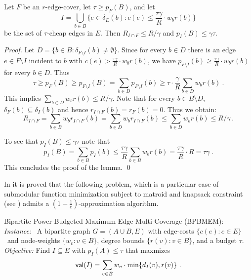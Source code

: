 \documentclass{llncs}
\begin{document}
\begin{lemma} \label{l:cheap}
Let $F$ be an $r$-edge-cover, let $\tau \geq p_F(B)$, and let 
$$I=\bigcup\limits_{b \in B} \{e \in \delta_E(b):c(e) \leq \frac{\tau\gamma}{R} \cdot w_b r(b)\}$$ 
be the set of $\tau$-cheap edges in $E$.
Then $R_{I \cap F} \leq R/\gamma$ and $p_I(B) \leq \gamma \tau$.
\end{lemma}
\begin{proof}
Let $D=\{b \in B: \delta_{F \setminus I}(b) \neq \emptyset\}$. 
Since for every $b \in D$ there is an edge $e \in F \setminus I$ incident to
$b$ with $c(e) > \frac{\tau\gamma}{R} \cdot w_b r(b)$,
we have $p_{F \setminus I}(b) \geq \frac{\tau \gamma}{R} \cdot w_b r(b)$ for every $b \in D$.
Thus
$$\tau \geq p_F(B) \geq p_{F \setminus I}(B) = \sum_{b \in D} p_{F \setminus I}(b) \geq 
\tau \cdot \frac{\gamma}{R} \sum_{b \in D} w_b r(b)  \ .$$
This implies $\sum_{b \in D} w_b r(b) \leq R/\gamma$. 
Note that for every $b \in B\setminus D$,
$\delta_F(b) \subseteq \delta_I(b)$ and hence $r_{I\cap F}(b)=r_F(b)=0$.
Thus we obtain:
$$R_{I\cap F} = \sum_{b \in B}w_b r_{I\cap F}(b) = \sum_{b \in D} w_b r_{I \cap F}(b) \leq 
\sum_{b \in D} w_b r(b) \leq R/\gamma \ .$$ 

To see that $p_I(B) \leq \gamma \tau$ note that
$$p_I(B)=\sum_{b \in B}p_I(b) \leq \frac{\tau \gamma}{R} \sum_{b \in B} w_b r(b)=
\frac{\tau \gamma}{R} \cdot R = \tau \gamma \ .$$
This concludes the proof of the lemma.
\qed
\end{proof}

In \cite{KMNT} it is proved that the following problem,
which is a particular case of submodular function  minimization subject to 
matroid and knapsack constraint (see \cite{LNMN}) admits a 
$\left(1-\frac{1}{e}\right)$-approximation algorithm.

\vspace{0.2cm}

\noindent
{\sf Bipartite Power-Budgeted Maximum Edge-Multi-Coverage} ({\sf BPBMEM}): \\
{\em Instance:} \ A bipartite graph $G=(A \cup B,E)$ with edge-costs $\{c(e):e \in E\}$~and
\hphantom{\em Instance: } node-weights $\{w_v:v \in B\}$,  
degree bounds $\{r(v):v \in B\}$, and a \hphantom{\em Instance: } budget $\tau$.\\
{\em Objective:} Find $I \subseteq E$ with $p_I(A) \leq \tau$ that maxmizes
$${\sf val}(I)=\sum_{v \in B} w_v \cdot \min\{d_I(v),r(v)\} \ .$$

\vspace{0.2cm}
\end{document}
